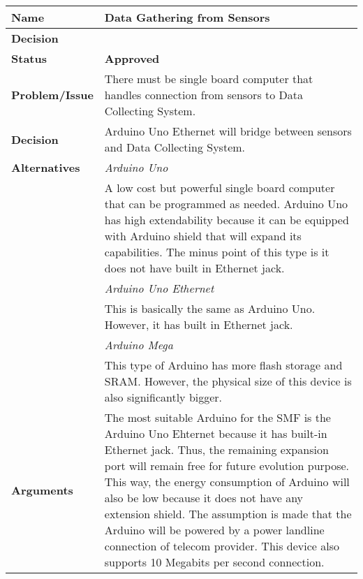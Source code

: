 \begin{table}[H]
	\begin{tabular}{L{0.2\textwidth} L{0.6\textwidth}}
		\textbf{Name}           & \textbf{Data Gathering from Sensors} \\ \toprule
		\textbf{Decision}       & \textbf{}\\ \midrule
		\textbf{Status}         & \textbf{Approved} \\ \midrule
		\textbf{Problem/Issue}  & There must be single board computer that handles connection from sensors to Data Collecting System. \\ \midrule
		\textbf{Decision}       & Arduino Uno Ethernet will bridge between sensors and Data Collecting System.\\ \midrule
		\textbf{Alternatives}   & \textit{Arduino Uno}\\
		& A low cost but powerful single board computer that can be programmed as needed. Arduino Uno has high extendability because it can be equipped with Arduino shield that will expand its capabilities. The minus point of this type is it does not have built in Ethernet jack. \\
		& \textit{Arduino Uno Ethernet}\\
		& This is basically the same as Arduino Uno. However, it has built in Ethernet jack.\\
		& \textit{Arduino Mega}\\
		& This type of Arduino has more flash storage and SRAM. However, the physical size of this device is also significantly bigger.\\
		\midrule
		\textbf{Arguments}      & The most suitable Arduino for the SMF is the Arduino Uno Ehternet because it has built-in Ethernet jack. Thus, the remaining expansion port will remain free for future evolution purpose. This way, the energy consumption of Arduino will also be low because it does not have any extension shield. The assumption is made that the Arduino will be powered by a power landline connection of telecom provider. This device also supports 10 Megabits per second connection.
						

\end{tabular}
\end{table}

